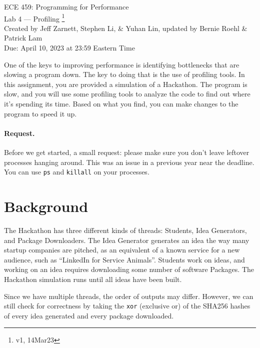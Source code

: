 



\begin{center}
{\Large ECE 459: Programming for Performance}\\
{\Large Lab 4 --- Profiling \footnote{v1, 14Mar23}}\\[1em]
{
Created by Jeff Zarnett, Stephen Li, \& Yuhan Lin, updated by Bernie Roehl \& Patrick Lam
}\\
Due: April 10, 2023 at 23:59 Eastern Time
\end{center}


One of the keys to improving performance is identifying bottlenecks that are slowing a program down. The key to doing that is the use of profiling tools. In this assignment, you are provided a simulation of a Hackathon. The program is slow,  and you will use some profiling tools to analyze the code to find out where it's spending its time. Based on what you find, you can make changes to the program to speed it up. 

\paragraph{Request.} Before we get started, a small request: please make sure you don't leave leftover processes hanging around. This was an issue in a previous year near the deadline. You can use \texttt{ps} and \texttt{killall} on your processes.

\section*{Background}


The Hackathon has three different kinds of threads: Students, Idea Generators, and Package Downloaders. The Idea Generator generates an idea the way many startup companies are pitched, as an equivalent of a known service for a new audience, such as ``LinkedIn for Service Animals''. Students work on ideas, and working on an idea requires downloading some number of software Packages. The Hackathon simulation runs until all ideas have been built. 


Since we have multiple threads, the order of outputs may differ. However, we can still check for correctness by taking the \texttt{xor} (exclusive or) of the SHA256 hashes of every idea generated and every package downloaded. 

